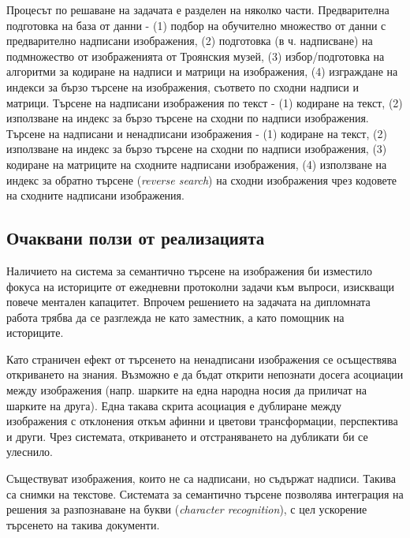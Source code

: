 \documentclass[a4paper,12pt]{article}
\begin{document}
\bigbreak

Процесът по решаване на задачата е разделен на няколко части. Предварителна подготовка на база от данни - (1) подбор на обучително множество от данни с предварително надписани изображения, (2) подготовка (в ч. надписване) на подмножество от изображенията от Троянския музей, (3) избор/подготовка на алгоритми за кодиране на надписи и матрици на изображения, (4) изграждане на индекси за бързо търсене на изображения, съответо по сходни надписи и матрици. Търсене на надписани изображения по текст - (1) кодиране на текст, (2) използване на индекс за бързо търсене на сходни по надписи изображения. Търсене на надписани и ненадписани изображения - (1) кодиране на текст, (2) използване на индекс за бързо търсене на сходни по надписи изображения, (3) кодиране на матриците на сходните надписани изображения, (4) използване на индекс за обратно търсене (\textit{reverse search}) на сходни изображения чрез кодовете на сходните надписани изображения.

\subsection{Очаквани ползи от реализацията}

Наличието на система за семантично търсене на изображения би изместило фокуса на историците от ежедневни протоколни задачи към въпроси, изискващи повече ментален капацитет. Впрочем решението на задачата на дипломната работа трябва да се разглежда не като заместник, а като помощник на историците.

\bigbreak

Като страничен ефект от търсенето на ненадписани изображения се осъществява откриването на знания. Възможно е да бъдат открити непознати досега асоциации между изображения (напр. шарките на една народна носия да приличат на шарките на друга). Една такава скрита асоциация е дублиране между изображения с отклонения откъм афинни и цветови трансформации, перспектива и други. Чрез системата, откриването и отстраняването на дубликати би се улеснило.

\bigbreak

Съществуват изображения, които не са надписани, но съдържат надписи. Такива са снимки на текстове. Системата за семантично търсене позволява интеграция на решения за разпознаване на букви (\textit{character recognition}), с цел ускорение търсенето на такива документи.
\end{document}
